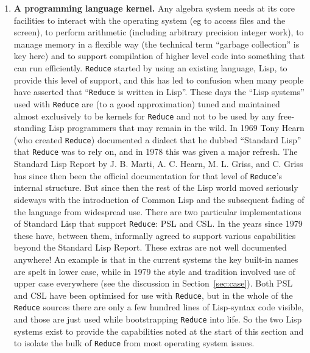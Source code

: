 \documentclass[12pt,twoside,openright]{memoir}
\newcommand{\reduce}{\texttt{Reduce}\xspace}
\begin{document}
\begin{enumerate}
\item \textbf{A programming language kernel.}  Any algebra system needs at its
  core facilities to interact with the operating system (eg to access files and
  the screen), to perform arithmetic (including arbitrary precision integer
  work), to manage memory in a flexible way (the technical term ``garbage
  collection'' is key here) and to support compilation of higher level code
  into something that can run efficiently.  \reduce started by using an
  existing language, Lisp, to provide this level of support, and this has led
  to confusion when many people have asserted that ``\reduce is written in
  Lisp''. These days the ``Lisp systems'' used with \reduce are (to a good
  approximation) tuned and maintained almost exclusively to be kernels for
  \reduce and not to be used by any free-standing Lisp programmers that may
  remain in the wild. In 1969 Tony Hearn (who created \reduce) documented a
  dialect that he dubbed ``Standard Lisp'' that \reduce was to rely on, and in
  1978 this was given a major refresh. The Standard Lisp Report by J. B. Marti,
  A. C. Hearn, M. L. Griss, and C. Griss has since then been the official
  documentation for that level of \reduce's internal structure. But since then
  the rest of the Lisp world moved seriously sideways with the introduction of
  Common Lisp and the subsequent fading of the language from widespread use.
  There are two particular implementations of Standard Lisp that support
  \reduce: PSL and CSL. In the years since 1979 these have, between them,
  informally agreed to support various capabilities beyond the Standard Lisp
  Report. These extras are not well documented anywhere! An example is that in
  the current systems the key built-in names are spelt in lower case, while in
  1979 the style and tradition involved use of upper case everywhere (see the
  discussion in Section~\ref{sec:case}).  Both PSL and CSL have been optimised
  for use with \reduce, but in the whole of the \reduce sources there are only
  a few hundred lines of Lisp-syntax code visible, and those are just used
  while bootstrapping \reduce into life. So the two Lisp systems exist to
  provide the capabilities noted at the start of this section and to isolate
  the bulk of \reduce from most operating system issues.


\end{enumerate}
\end{document}
